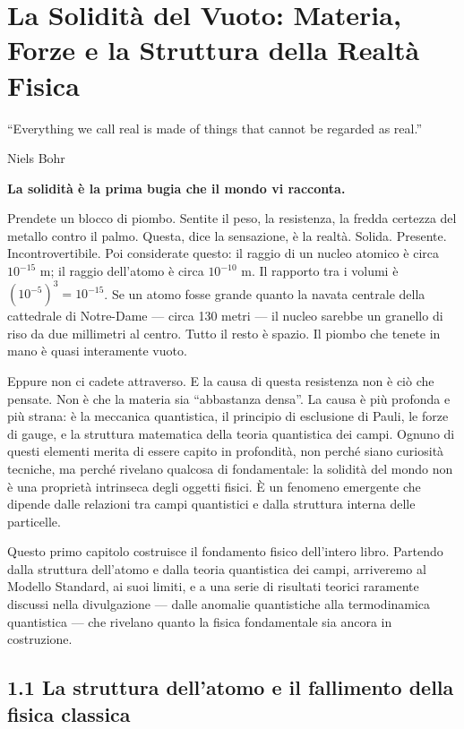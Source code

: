 \documentclass[11.5pt,a4paper,openany]{book}
\theoremstyle{remark}
\begin{document}
\chapter{La Solidità del Vuoto: Materia, Forze e la Struttura della Realtà Fisica}

\epigraph{``Everything we call real is made of things that cannot be regarded as real.''}{Niels Bohr}

\textbf{La solidità è la prima bugia che il mondo vi racconta.}

Prendete un blocco di piombo. Sentite il peso, la resistenza, la fredda certezza del metallo contro il palmo. Questa, dice la sensazione, è la realtà. Solida. Presente. Incontrovertibile. Poi considerate questo: il raggio di un nucleo atomico è circa $10^{-15}$ m; il raggio dell'atomo è circa $10^{-10}$ m. Il rapporto tra i volumi è $(10^{-5})^3 = 10^{-15}$. Se un atomo fosse grande quanto la navata centrale della cattedrale di Notre-Dame --- circa 130 metri --- il nucleo sarebbe un granello di riso da due millimetri al centro. Tutto il resto è spazio. Il piombo che tenete in mano è quasi interamente vuoto.

Eppure non ci cadete attraverso. E la causa di questa resistenza non è ciò che pensate. Non è che la materia sia ``abbastanza densa''. La causa è più profonda e più strana: è la meccanica quantistica, il principio di esclusione di Pauli, le forze di gauge, e la struttura matematica della teoria quantistica dei campi. Ognuno di questi elementi merita di essere capito in profondità, non perché siano curiosità tecniche, ma perché rivelano qualcosa di fondamentale: la solidità del mondo non è una proprietà intrinseca degli oggetti fisici. È un fenomeno emergente che dipende dalle relazioni tra campi quantistici e dalla struttura interna delle particelle.

Questo primo capitolo costruisce il fondamento fisico dell'intero libro. Partendo dalla struttura dell'atomo e dalla teoria quantistica dei campi, arriveremo al Modello Standard, ai suoi limiti, e a una serie di risultati teorici raramente discussi nella divulgazione --- dalle anomalie quantistiche alla termodinamica quantistica --- che rivelano quanto la fisica fondamentale sia ancora in costruzione.

\section{1.1 La struttura dell'atomo e il fallimento della fisica classica}
\end{document}
